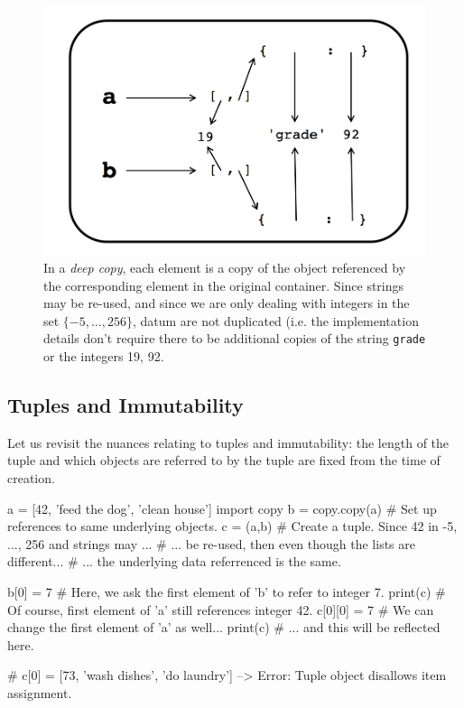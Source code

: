 \documentclass[12pt,letterpaper,twoside]{article}
\begin{document}
\begin{figure}[h]
\centering
\includegraphics[scale=0.35]{fig/deep-copy-mutables.png}
\caption{\small In a \emph{deep copy}, each element is a copy of the object referenced by the corresponding
  element in the original container. Since strings may be re-used, and since we are only dealing with
  integers in the set $\{-5, \ldots, 256\}$, datum are not duplicated (i.e. the implementation details
  don't require there to be additional copies of the string \texttt{grade} or the integers 19, 92.}
\end{figure}

\subsection{Tuples and Immutability}
Let us revisit the nuances relating to tuples and immutability: the length of the tuple and which objects
are referred to by the tuple are fixed from the time of creation.

\begin{python}
a = [42, 'feed the dog', 'clean house']
import copy
b = copy.copy(a)  # Set up references to same underlying objects.
c = (a,b)         # Create a tuple. Since 42 in {-5, ..., 256} and strings may ...
                  # ... be re-used, then even though the lists are different...
                  # ... the underlying data referrenced is the same.

b[0] = 7          # Here, we ask the first element of 'b' to refer to integer 7.
print(c)          # Of course, first element of 'a' still references integer 42.
c[0][0] = 7       # We can change the first element of 'a' as well...
print(c)          # ... and this will be reflected here.

# c[0] = [73, 'wash dishes', 'do laundry'] --> Error: Tuple object disallows item assignment.
\end{python}
\end{document}
